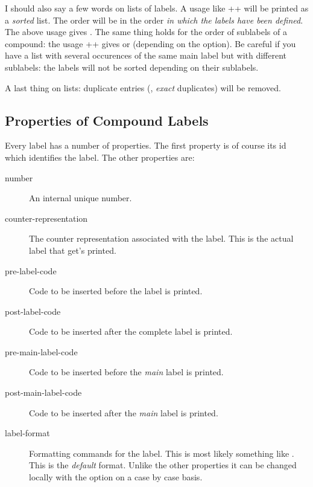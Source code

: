 \documentclass[load-preamble+,babel-options={ngerman,british,american}]{cnltx-doc}
\begin{document}
I should also say a few words on lists of labels.  A usage like
\verbcode++ will be printed as a \emph{sorted} list.  The order
will be in the order \emph{in which the labels have been defined}.  The above
usage gives .  The same thing holds for the order of sublabels
of a compound: the usage \verbcode++ gives
 or
 (depending on the
 option).  Be careful if you have a list with several
occurences of the same main label but with different sublabels: the labels
will not be sorted depending on their sublabels.
\begin{example}
   \par
   \par
   \par
\end{example}

A last thing on lists: duplicate entries (\ie, \emph{exact} duplicates) will
be removed.

\subsection{Properties of Compound Labels}\label{sec:prop-comp-labels}

Every label has a number of properties.  The first property is of course its
\ac{id} which identifies the label.  The other properties are:
\begin{description}
  \item[number] An internal unique number.
  \item[counter-representation] The counter representation associated with the
    label.  This is the actual label that get's printed.
  \item[pre-label-code] Code to be inserted before the label is printed.
  \item[post-label-code] Code to be inserted after the complete label is
    printed.
  \item[pre-main-label-code] Code to be inserted before the \emph{main} label
    is printed.
  \item[post-main-label-code] Code to be inserted after the \emph{main} label
    is printed.
  \item[label-format] Formatting commands for the label.  This is most likely
    something like .  This is the \emph{default} format.  Unlike
    the other properties it can be changed locally with the 
    option on a case by case basis.
\end{description}
\end{document}
